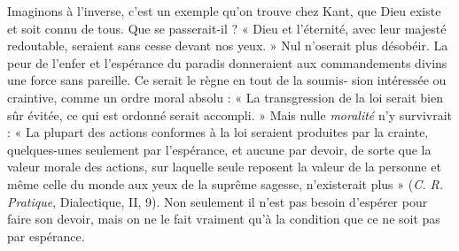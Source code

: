 Imaginons à l'inverse, c’est un exemple qu’on trouve chez Kant, que Dieu
existe et soit connu de tous. Que se passerait-il ? « Dieu et l’éternité, avec leur
majesté redoutable, seraient sans cesse devant nos yeux. » Nul n’oserait plus
désobéir. La peur de l’enfer et l’espérance du paradis donneraient aux commandements
divins une force sans pareille. Ce serait le règne en tout de la soumis-
sion intéressée ou craintive, comme un ordre moral absolu : « La transgression
de la loi serait bien sûr évitée, ce qui est ordonné serait accompli. » Mais nulle
{\it moralité} n’y survivrait : « La plupart des actions conformes à la loi seraient produites
par la crainte, quelques-unes seulement par l’espérance, et aucune par
devoir, de sorte que la valeur morale des actions, sur laquelle seule reposent la
valeur de la personne et même celle du monde aux yeux de la suprême sagesse,
n'existerait plus » ({\it C. R. Pratique}, Dialectique, II, 9). Non seulement il n’est
pas besoin d’espérer pour faire son devoir, mais on ne le fait vraiment qu’à la
condition que ce ne soit pas par espérance.

